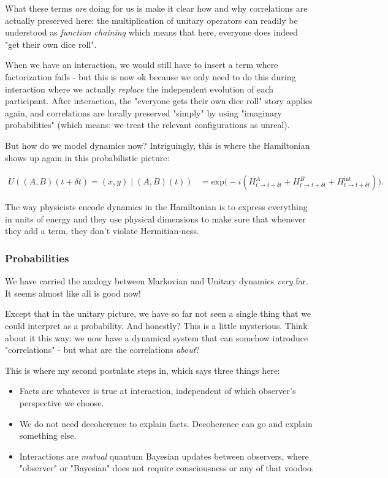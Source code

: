 \documentclass{article}
\begin{document}
What these terms \textit{are} doing for us is make it clear how and why correlations are actually preserved here: the multiplication of unitary operators can readily be understood as \textit{function chaining} which means that here, everyone does indeed "get their own dice roll".

When we have an interaction, we would still have to insert a term where factorization fails - but this is now ok because we only need to do this during interaction where we actually \textit{replace} the independent evolution of each participant. After interaction, the "everyone gets their own dice roll" story applies again, and correlations are locally preserved "simply" by using "imaginary probabilities" (which means: we treat the relevant configurations as unreal).

But how do we model dynamics now? Intriguingly, this is where the Hamiltonian shows up again in this probabilistic picture:

\begin{align*}
 U((A,B)(t+\delta t) = (x,y)\mid (A,B)(t)) &= \text{exp}\big (-i( H^A_{t \to t+\delta t} + H^B_{t \to t+\delta t} + H^{\text{int}}_{t \to t+\delta t}) \big ).
 \end{align*}

The way physicists encode dynamics in the Hamiltonian is to express everything in units of energy and they use physical dimensions to make sure that whenever they add a term, they don't violate Hermitian-ness.

\subsubsection{Probabilities}

We have carried the analogy between Markovian and Unitary dynamics \textit{very} far. It seems almost like all is good now!

Except that in the unitary picture, we have so far not seen a single thing that we could interpret as a probability. And honestly? This is a little mysterious. Think about it this way: we now have a dynamical system that can somehow introduce "correlations" - but what are the correlations \textit{about}?

This is where my second postulate steps in, which says three things here:
\begin{itemize}
\item Facts are whatever is true at interaction, independent of which observer's perspective we choose.
\item We do not need decoherence to explain facts. Decoherence can go and explain something else.
\item Interactions are \textit{mutual} quantum Bayesian updates between observers, where "observer" or "Bayesian" does not require consciousness or any of that voodoo.
\end{itemize}
\end{document}
